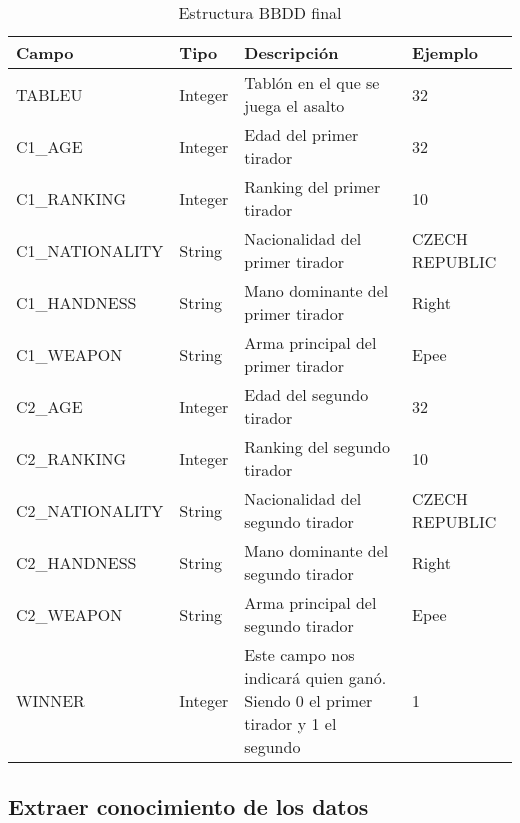 \begin{table}[]
  \centering
  \caption{Estructura BBDD final}
  \label{Estructura BBDD final}
  \begin{tabular}{|llll|}
    \hline \rowcolor[HTML]{C0C0C0}
    Campo & Tipo & Descripción & Ejemplo \\ \hline
    TABLEU & Integer & Tablón en el que se juega el asalto & 32 \\ \hline

    \rowcolor[HTML]{969696}
    C1\_AGE & Integer & Edad del primer tirador & 32 \\ \hline
    \rowcolor[HTML]{969696}
    C1\_RANKING & Integer & Ranking del primer tirador & 10 \\ \hline
    \rowcolor[HTML]{969696}
    C1\_NATIONALITY & String & Nacionalidad del primer tirador & CZECH REPUBLIC \\ \hline
    \rowcolor[HTML]{969696}
    C1\_HANDNESS & String & Mano dominante del primer tirador & Right \\ \hline
    \rowcolor[HTML]{969696}
    C1\_WEAPON & String & Arma principal del primer tirador & Epee \\ \hline

    \rowcolor[HTML]{636363}
    C2\_AGE & Integer & Edad del segundo tirador & 32 \\ \hline
    \rowcolor[HTML]{636363}
    C2\_RANKING & Integer & Ranking del segundo tirador & 10 \\ \hline
    \rowcolor[HTML]{636363}
    C2\_NATIONALITY & String & Nacionalidad del segundo tirador & CZECH REPUBLIC \\ \hline
    \rowcolor[HTML]{636363}
    C2\_HANDNESS & String & Mano dominante del segundo tirador & Right \\ \hline
    \rowcolor[HTML]{636363}
    C2\_WEAPON & String & Arma principal del segundo tirador & Epee \\ \hline

    \rowcolor[HTML]{969696}
    WINNER & Integer & Este campo nos indicará quien ganó. Siendo 0 el primer tirador y 1 el segundo & 1 \\ \hline

  \end{tabular}
\end{table}

\subsection{Extraer conocimiento de los datos}

